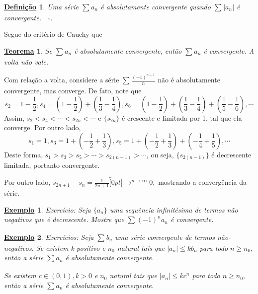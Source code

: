 \documentclass{article}
\newtheorem*{def*}{\underline{Defini\c c\~ao}}
\newtheorem*{theorem*}{\underline{Teorema}}
\newtheorem{example}{\underline{Exemplo}}
\begin{document}
 \begin{def*}
   Uma s\'erie $\sum\limits_{}^{}a_{n}$ \'e absolutamente convergente quando $\sum\limits_{}^{}|a_{n}|$ \'e convergente.$\quad\square.$
 \end{def*}
 Segue do crit\'erio de Cauchy que 
\begin{theorem*}
  Se $\sum\limits_{}^{}a_{n}$ \'e absolutamente convergente, ent\~ao $\sum\limits_{}^{}a_{n}$ \'e convergente. A volta n\~ao vale.
\end{theorem*}
  Com rela\c c\~ao a volta, considere a s\'erie $\sum\limits_{}^{}\frac{(-1)^{n+1}}{n}$ n\~ao \'e absolutamente convergente, mas converge. 
  De fato, note que 
    $$
      s_{2} = 1 - \frac{1}{2}, s_{4} = (1-\frac{1}{2}) + (\frac{1}{3}-\frac{1}{4}), s_{6} = (1-\frac{1}{2}) + (\frac{1}{3}-\frac{1}{4}) + (\frac{1}{5}-\frac{1}{6}), \cdots
    $$
    Assim, $s_{2}<s_{4}<\cdots<s_{2n}<\cdots$ e $\{s_{2n}\}$ \'e crescente e limitada por 1, tal que ela converge. Por outro lado, 
      $$
        s_{1} = 1, s_{3} = 1 + (-\frac{1}{2} + \frac{1}{3}), s_{5} = 1 + (-\frac{1}{2}+\frac{1}{3}) + (-\frac{1}{4}+\frac{1}{5}), \cdots
      $$ 
      Deste forma, $s_{1} > s_{3} > s_{5} > \cdots > s_{2(n-1)} > \cdots$, ou seja, $\{s_{2(n-1)}\}$ \'e decrescente limitada, portanto convergente.

      Por outro lado, $s_{2n+1}-s_{n} = \frac{1}{2n+1}\overbracket[0pt]{\longrightarrow}^{n\to \infty}0,$ mostrando a converg\^encia da s\'erie.
 \begin{example}
   Exerc\'icio: Seja $\{a_{n}\}$ uma sequ\^encia infinit\'esima de termos n\~ao negativos que \'e decrescente. Mostre que $\sum\limits_{}^{}(-1)^{n}a_{n}$
  \'e convergente.
 \end{example}
\begin{example}
  Exerc\'icios: Seja $\sum\limits_{}^{}b_{n}$ uma s\'erie convergente de termos n\~ao-negativos. Se existem k positivo e $n_{0}$
natural tais que $|a_{n}|\leq{kb_{n}}$ para todo $n\geq{n_{0}},$ ent\~ao a s\'erie $\sum\limits_{}^{}a_{n}$ \'e absolutamente convergente.

  Se existem $c\in(0, 1), k > 0$ e $n_{0}$ natural tais que $|a_{n}|\leq{kc^{n}}$ para todo $n\geq{n_{0}},$ ent\~ao a s\'erie 
 $\sum\limits_{}^{}a_{n}$ \'e absolutamente convergente.
\end{example}
\end{document}
